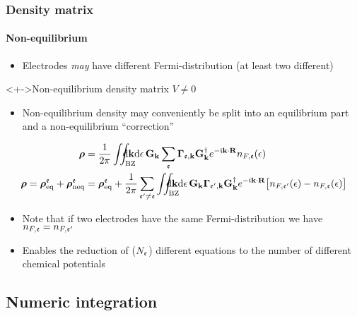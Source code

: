 \begin{frame}
  \frametitle{Density matrix}
  \framesubtitle{Non-equilibrium}

  \begin{itemize}
    \item Electrodes \emph{may} have different Fermi-distribution (at least two different)
  \end{itemize}

  \begin{block}<+->{Non-equilibrium density matrix $V\neq0$}
    \begin{itemize}
      \item Non-equilibrium density may conveniently be split into an equilibrium part and
      a non-equilibrium ``correction''
    \end{itemize}
    \begin{align*}
      \DM &= \frac1{2\pi}\iint_\BZ\dEBZ\cd \kk \dd\E\, %
      \G_\kk \sum_\idxE\Scat_{\idxE,\kk} \G^\dagger_\kk\eikr n_{F,\idxE}(\E) %
      \\
      \DM=\DE^\idxE+\DN^\idxE &=\DE^\idxE+
      \frac1{2\pi}\sum_{\idxE'\neq\idxE}\iint_\BZ\dEBZ\cd \kk\dd\E\, %
      \G_\kk \Scat_{\idxE',\kk}
      \G^\dagger_\kk\eikr\big[n_{F,\idxE'}(\E)-n_{F,\idxE}(\E)\big]
    \end{align*}
    \begin{itemize}
      \item<+-> %
      Note that if two electrodes have the same Fermi-distribution we have
      $n_{F,\mathfrak{e}}=n_{F,\mathfrak{e}'}$

      \item<+-> %
      Enables the reduction of ($N_{\mathfrak{e}}$) different equations to the number of different chemical potentials

    \end{itemize}

  \end{block}
  
\end{frame}


\subsection{Numeric integration}

